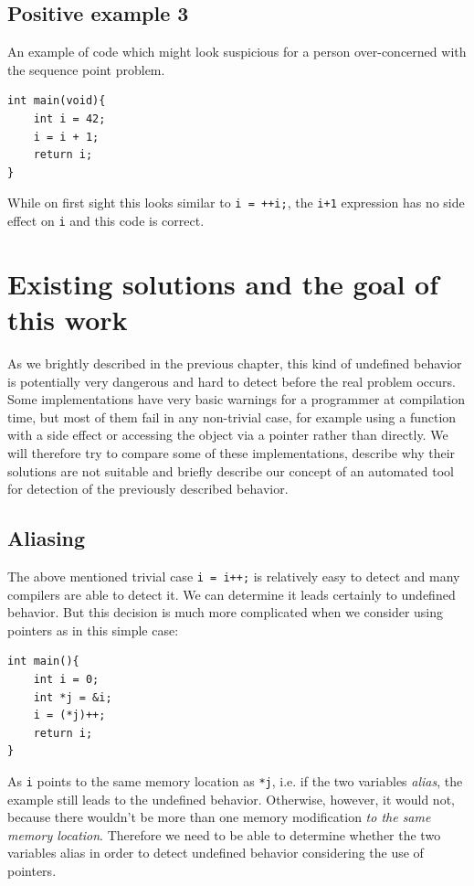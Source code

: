\section{Positive example 3}
An example of code which might look suspicious for a person over-concerned with the sequence point problem.
\begin{lstlisting}
int main(void){
    int i = 42;
    i = i + 1;
    return i;
}
\end{lstlisting}
While on first sight this looks similar to \verb|i = ++i;|, the \verb|i+1| expression has no side effect on \verb|i| and this code is correct.

\chapter{Existing solutions and the goal of this work}
As we brightly described in the previous chapter, this kind of undefined behavior is potentially very dangerous and hard to detect before the real problem occurs. Some implementations have very basic warnings for a programmer at compilation time, but most of them fail in any non-trivial case, for example using a function with a side effect or accessing the object via a pointer rather than directly. We will therefore try to compare some of these implementations, describe why their solutions are not suitable and briefly describe our concept of an automated tool for detection of the previously described behavior.
\section{Aliasing}
The above mentioned trivial case \verb|i = i++;| is relatively easy to detect and many compilers are able to detect it.
We can determine it leads certainly to undefined behavior. But this decision is much more complicated when we consider using pointers as in this simple case:

\begin{lstlisting}
int main(){
	int i = 0;
	int *j = &i;
	i = (*j)++;
    return i;
}
\end{lstlisting}

As \verb|i| points to the same memory location as \verb|*j|, i.e. if the two variables \emph{alias}, the example still leads to the undefined behavior. Otherwise, however, it would not, because there wouldn't be more than one memory modification \emph{to the same memory location}. Therefore we need to be able to determine whether the two variables alias in order to detect undefined behavior considering the use of pointers.
